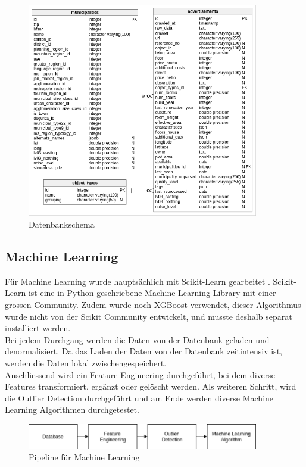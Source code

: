 \begin{figure}[h]
\centering
\includegraphics[width=0.9\textwidth]{images/erm.png}
\caption[Datenbankschema]{Datenbankschema}%
\label{fig:db}
\end{figure}

\subsection{Machine Learning}
Für Machine Learning wurde hauptsächlich mit Scikit-Learn gearbeitet \cite{scikit}. Scikit-Learn ist eine in Python geschriebene Machine Learning Library mit einer grossen Community. Zudem wurde noch XGBoost verwendet, dieser Algorithmus wurde nicht von der Scikit Community entwickelt, und musste deshalb separat installiert werden. \\[2ex]
%
Bei jedem Durchgang werden die Daten von der Datenbank geladen und denormalisiert. Da das Laden der Daten von der Datenbank zeitintensiv ist, werden die Daten lokal zwischengespeichert.\\
Anschliessend wird ein Feature Engineering durchgeführt, bei dem diverse Features transformiert, ergänzt oder gelöscht werden. Als weiteren Schritt, wird die Outlier Detection durchgeführt und am Ende werden diverse Machine Learning Algorithmen durchgetestet.

\begin{figure}[h]
\centering
\includegraphics[width=0.9\textwidth]{images/machine_learning_pipeline.png}
\caption[Pipeline für Machine Learning]{Pipeline für Machine Learning}%
\label{fig:ml_pipeline}
\end{figure}

